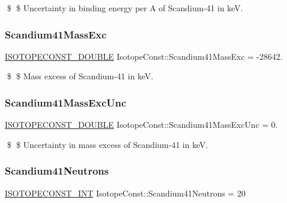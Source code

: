 \$ \$ Uncertainty in binding energy per A of Scandium-\/41 in keV. \mbox{\label{group___isotope_const-_scandium-_sc41_gaeb6c9e3c0049e7b13cf8a35e8796f662}} 
\subsubsection{\texorpdfstring{Scandium41\+Mass\+Exc}{Scandium41MassExc}}
{\footnotesize\ttfamily \mbox{\hyperlink{group___isotope_const-_macros_ga8f45a7272ce02c0b4c65c44636ed719a}{I\+S\+O\+T\+O\+P\+E\+C\+O\+N\+S\+T\+\_\+\+D\+O\+U\+B\+LE}} Isotope\+Const\+::\+Scandium41\+Mass\+Exc = -\/28642.}

\$ \$ Mass excess of Scandium-\/41 in keV. \mbox{\label{group___isotope_const-_scandium-_sc41_gac86014f2f640135d5de7aff8efaf4d56}} 
\subsubsection{\texorpdfstring{Scandium41\+Mass\+Exc\+Unc}{Scandium41MassExcUnc}}
{\footnotesize\ttfamily \mbox{\hyperlink{group___isotope_const-_macros_ga8f45a7272ce02c0b4c65c44636ed719a}{I\+S\+O\+T\+O\+P\+E\+C\+O\+N\+S\+T\+\_\+\+D\+O\+U\+B\+LE}} Isotope\+Const\+::\+Scandium41\+Mass\+Exc\+Unc = 0.}

\$ \$ Uncertainty in mass excess of Scandium-\/41 in keV. \mbox{\label{group___isotope_const-_scandium-_sc41_ga3ecd50cb035d0d4c080ed0f7a13b9a84}} 
\subsubsection{\texorpdfstring{Scandium41\+Neutrons}{Scandium41Neutrons}}
{\footnotesize\ttfamily \mbox{\hyperlink{group___isotope_const-_macros_ga5f18360b3e99483a35c32d789e62621c}{I\+S\+O\+T\+O\+P\+E\+C\+O\+N\+S\+T\+\_\+\+I\+NT}} Isotope\+Const\+::\+Scandium41\+Neutrons = 20}

